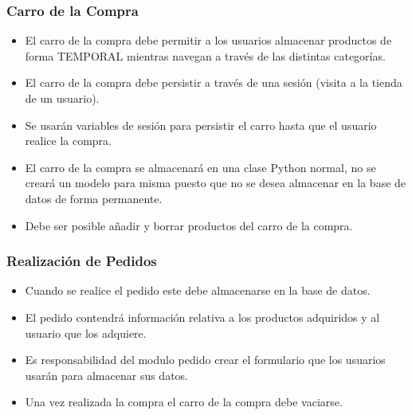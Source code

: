 \documentclass[12pt]{article} %
\begin{document}
\subsubsection{Carro de la Compra}
\begin{itemize}


  \item El  carro de la compra debe permitir a los usuarios almacenar productos de forma TEMPORAL mientras navegan a través de las distintas categorías.
  \item El carro de la compra debe persistir a través de una sesión (visita a la tienda de un usuario).
  \item Se usarán variables de sesión para persistir el carro hasta que el usuario realice la compra.
  \item El carro de la compra se almacenará en una clase Python normal, no se creará un modelo para misma puesto que no se desea almacenar en la base de datos de forma permanente.
  \item Debe ser posible añadir y borrar productos del carro de la compra.
\end{itemize}


\subsubsection{Realización de Pedidos}
\begin{itemize}



  \item Cuando se realice el pedido este debe almacenarse en la base de datos.
  \item El pedido contendrá información relativa a los productos adquiridos y al usuario que los adquiere.
  \item Es responsabilidad del modulo pedido crear el formulario que los usuarios usarán para almacenar sus datos.
  \item Una vez realizada la compra el carro de la compra debe vaciarse.
\end{itemize}
\end{document}
